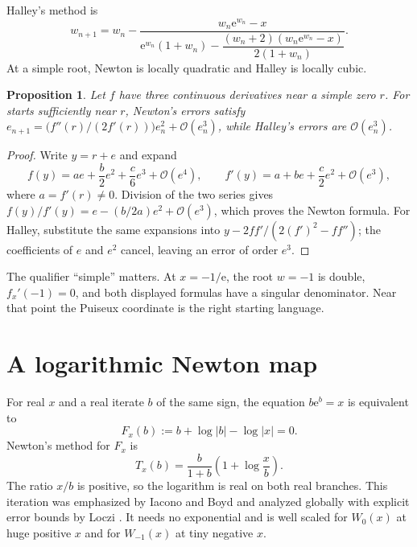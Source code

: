 \documentclass[11pt,oneside]{book}
\newtheorem{proposition}[theorem]{Proposition}
\theoremstyle{definition}
\theoremstyle{remark}
\newcommand{\ee}{\mathrm e}
\newcommand{\bigO}{\mathcal O}
\begin{document}
Halley's method is
\begin{equation}\label{eq:halley}
 w_{n+1}=w_n-
 \frac{w_n\ee^{w_n}-x}
 {\ee^{w_n}(1+w_n)-
 \dfrac{(w_n+2)(w_n\ee^{w_n}-x)}{2(1+w_n)}}.
\end{equation}
At a simple root, Newton is locally quadratic and Halley is locally cubic.

\begin{proposition}\label{prop:newtonhalleyorders}
Let $f$ have three continuous derivatives near a simple zero $r$.
For starts sufficiently near $r$, Newton's errors satisfy
$e_{n+1}=\bigl(f''(r)/(2f'(r))\bigr)e_n^2+\bigO(e_n^3)$, while Halley's
errors are $\bigO(e_n^3)$.
\end{proposition}

\begin{proof}
Write $y=r+e$ and expand
\[
 f(y)=a e+\frac b2e^2+\frac c6e^3+\bigO(e^4),
 \qquad
 f'(y)=a+b e+\frac c2e^2+\bigO(e^3),
\]
where $a=f'(r)\ne0$.  Division of the two series gives
$f(y)/f'(y)=e-(b/2a)e^2+\bigO(e^3)$, which proves the Newton formula.
For Halley, substitute the same expansions into
$y-2ff'/(2(f')^2-ff'')$; the coefficients of $e$ and $e^2$ cancel, leaving
an error of order $e^3$.
\end{proof}

The qualifier ``simple'' matters.  At $x=-1/\ee$, the root $w=-1$ is double,
$f_x'(-1)=0$, and both displayed formulas have a singular denominator.
Near that point the Puiseux coordinate is the right starting language.

\section{A logarithmic Newton map}

For real $x$ and a real iterate $b$ of the same sign, the equation
$b\ee^b=x$ is equivalent to
\begin{equation}\label{eq:logrootfunction}
 F_x(b):=b+\log|b|-\log|x|=0.
\end{equation}
Newton's method for $F_x$ is
\begin{equation}\label{eq:lognewton}
 \boxed{\quad
 T_x(b)=\frac{b}{1+b}\left(1+\log\frac{x}{b}\right).
 \quad}
\end{equation}
The ratio $x/b$ is positive, so the logarithm is real on both real branches.
This iteration was emphasized by Iacono and Boyd and analyzed globally with
explicit error bounds by Loczi \cite{iacono2017,loczi2022}.  It needs no
exponential and is well scaled for $W_0(x)$ at huge positive $x$ and for
$W_{-1}(x)$ at tiny negative $x$.
\end{document}
